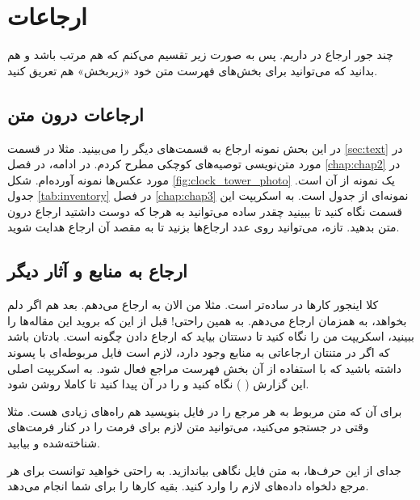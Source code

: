 \section{ 
ارجاعات
}
\label{sec:cross_refs}

چند جور ارجاع در
داریم. پس به صورت زیر تقسیم می‌کنم که هم مرتب باشد و هم بدانید که می‌توانید برای بخش‌های فهرست متن خود «زیربخش» هم تعریق کنید.

\subsection{
ارجاعات درون متن
}
در این بحش نمونه ارجاع به قسمت‌های دیگر را می‌بینید. مثلا در قسمت
\ref{sec:text} 
در مورد متن‌نویسی توصیه‌های کوچکی مطرح کردم. در ادامه، در فصل
\ref{chap:chap2}
در مورد عکس‌ها نمونه آورده‌ام. شکل
\ref{fig:clock_tower_photo}
یک نمونه از آن است. جدول
\ref{tab:inventory}
در فصل
\ref{chap:chap3}
نمونه‌ای از جدول است. به اسکریپت این قسمت نگاه کنید تا ببینید چقدر ساده می‌توانید به هرجا که دوست داشتید ارجاع درون متن بدهید. تازه، می‌توانید روی عدد ارجاع‌ها بزنید تا به مقصد آن ارجاع هدایت شوید.

\subsection{ارجاع به منابع و آثار دیگر}
کلا اینجور کارها در
ساده‌تر است. مثلا من الان به
\cite{romero2018speeded}
ارجاع می‌دهم. بعد هم اگر دلم بخواهد، به
\cite{ababsa2004robust, sahawarehouse, chapman2016computer}
همزمان ارجاع می‌دهم. به همین راحتی! قبل از این که بروید این مقاله‌ها را ببینید، اسکریپت من را نگاه کنید تا دستتان بیاید که ارجاع دادن چگونه است. بادتان باشد که اگر در متنتان ارجاعاتی به منابع وجود دارد، لازم است  فایل مربوطه‌ای با پسوند
داشته باشید که با استفاده از آن بخش فهرست مراجع فعال شود. به اسکریپت اصلی این گزارش (
) نگاه کنید و
را در آن پیدا کنید تا کاملا روشن شود.

برای آن که متن مربوط به هر مرجع را در فایل
بنویسید هم راه‌های زیادی هست. مثلا وقتی در
جستجو می‌کنید، می‌توانید متن لازم برای فرمت
را در کنار فرمت‌های شناخته‌شده
و
بیابید.

جدای از این حرف‌ها، به متن فایل
نگاهی بیاندازید. به راحتی خواهید توانست برای هر مرجع دلخواه داده‌های لازم را وارد کنید.
بقیه کارها را برای شما انجام می‌دهد.

